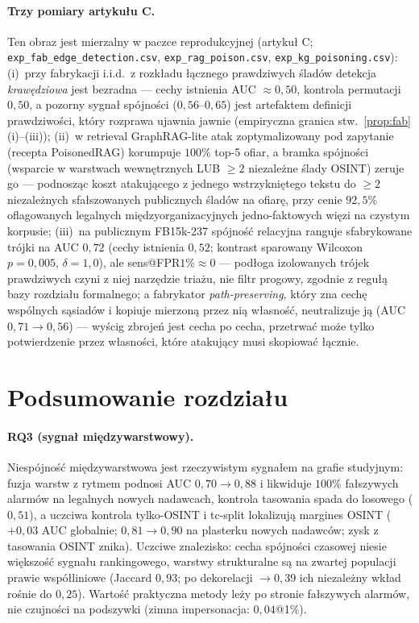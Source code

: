 \paragraph{Trzy pomiary artykułu C.} Ten obraz jest mierzalny w paczce
reprodukcyjnej (artykuł C; \texttt{exp\_fab\_edge\_detection.csv},
\texttt{exp\_rag\_poison.csv}, \texttt{exp\_kg\_poisoning.csv}):
(i)~przy fabrykacji i.i.d.\ z rozkładu łącznego prawdziwych śladów
detekcja \emph{krawędziowa} jest bezradna --- cechy istnienia AUC
$\approx0{,}50$, kontrola permutacji $0{,}50$, a pozorny sygnał
spójności ($0{,}56$--$0{,}65$) jest artefaktem definicji
prawdziwości, który rozprawa ujawnia jawnie (empiryczna granica
stw.~\ref{prop:fab}(i)--(iii)); (ii)~w retrieval GraphRAG-lite atak
zoptymalizowany pod zapytanie (recepta PoisonedRAG) korumpuje $100\%$
top-5 ofiar, a bramka spójności (wsparcie w warstwach wewnętrznych
LUB $\ge2$ niezależne ślady OSINT) zeruje go --- podnosząc koszt
atakującego z jednego wstrzykniętego tekstu do $\ge2$ niezależnych
sfałszowanych publicznych śladów na ofiarę, przy cenie $92{,}5\%$
oflagowanych legalnych międzyorganizacyjnych jedno-faktowych
więzi na czystym korpusie; (iii)~na publicznym FB15k-237 spójność
relacyjna ranguje sfabrykowane trójki na AUC $0{,}72$ (cechy
istnienia $0{,}52$; kontrast sparowany Wilcoxon $p{=}0{,}005$,
$\delta{=}1{,}0$), ale sens@FPR$1\%\approx0$ --- podłoga
izolowanych trójek prawdziwych czyni z niej narzędzie triażu,
nie filtr progowy, zgodnie z regułą bazy rozdziału formalnego;
a fabrykator \emph{path-preserving}, który zna cechę wspólnych
sąsiadów i kopiuje mierzoną przez nią własność, neutralizuje ją
(AUC $0{,}71\to0{,}56$) --- wyścig zbrojeń jest cecha po cecha,
przetrwać może tylko potwierdzenie przez własności, które
atakujący musi skopiować łącznie.

\section{Podsumowanie rozdziału}
\label{sec:m-podsumowanie}

\paragraph{RQ3 (sygnał międzywarstwowy).} Niespójność międzywarstwowa
jest rzeczywistym sygnałem na grafie studyjnym: fuzja warstw z rytmem
podnosi AUC $0{,}70\to0{,}88$ i likwiduje $100\%$ fałszywych alarmów
na legalnych nowych nadawcach, kontrola tasowania spada do losowego
($0{,}51$), a uczciwa kontrola tylko-OSINT i tc-split lokalizują
margines OSINT ($+0{,}03$ AUC globalnie; $0{,}81\to0{,}90$ na
plasterku nowych nadawców; zysk z tasowania OSINT znika). Uczciwe
znalezisko: cecha spójności czasowej niesie większość sygnału
rankingowego, warstwy strukturalne są na zwartej populacji prawie
współliniowe (Jaccard $0{,}93$; po dekorelacji $\to0{,}39$ ich
niezależny wkład rośnie do $0{,}25$). Wartość praktyczna metody
leży po stronie fałszywych alarmów, nie czujności na podszywki
(zimna impersonacja: $0{,}04$@1\%).

